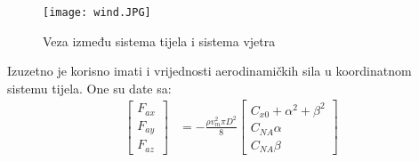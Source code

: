 \begin{figure}[ht!]
    \centering
    \texttt{[image: wind.JPG]}
    \caption{Veza između sistema tijela i sistema vjetra}
    \label{fig:wind}
\end{figure}
Izuzetno je korisno imati i vrijednosti aerodinamičkih sila u koordinatnom sistemu 
tijela. One su date sa:
\begin{align}
    \begin{bmatrix}
        F_{ax}\\F_{ay}\\F_{az} 
        \end{bmatrix}
        &= -\frac{\rho v_m^2\pi D^2}{8}\begin{bmatrix}
        C_{x0} + \alpha^2+\beta^2\\C_{NA}\alpha\\C_{NA}\beta
        \end{bmatrix}
\end{align}
